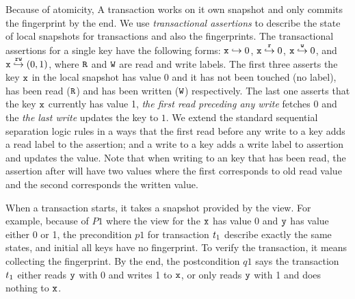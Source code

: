 Because of atomicity, A transaction works on it own snapshot and only commits the fingerprint by the end.
We use \emph{transactional assertions} to describe the state of local snapshots for transactions and also the fingerprints.
The transactional assertions for a single key have the following forms: \( \texttt{x} \hookrightarrow 0 \), \( \texttt{x} \stackrel{\texttt{r}}{\hookrightarrow} 0\), \( \texttt{x} \stackrel{\texttt{w}}{\hookrightarrow} 0\), and \( \texttt{x} \stackrel{\texttt{rw}}{\hookrightarrow} (0,1) \), where \( \texttt{R} \) and \( \texttt{W} \) are read and write labels.
The first three asserts the key \( \texttt{x} \) in the local snapshot has value 0 and it has not been touched (no label), has been read (\(\texttt{R}\)) and has been written (\(\texttt{W}\)) respectively.
The last one asserts that the key \( \texttt{x} \) currently has value 1, \emph{the first read preceding any write} fetches 0 and the \emph{the last write} updates the key to \( 1 \).
We extend the standard sequential separation logic rules in a ways that the first read before any write to a key adds a read label to the assertion; and a write to a key adds a write label to assertion and updates the value.
Note that when writing to an key that has been read, the assertion after will have two values where the first corresponds to old read value and the second corresponds the written value.

When a transaction starts, it takes a snapshot provided by the view.
For example,  because of \( P1 \) where the view for the \( \texttt{x} \) has value 0 and \( \texttt{y} \) has value either 0 or 1, the precondition \( p1 \) for transaction \( t_1 \) describe exactly the same states, and initial all keys have no fingerprint.
To verify the transaction, it means collecting the fingerprint.
By the end, the postcondition \( q1 \) says the transaction \( t_1 \) either reads \( \texttt{y} \) with 0 and writes 1 to \( \texttt{x} \), or only reads \( \texttt{y} \) with 1 and does nothing to \( \texttt{x} \).


